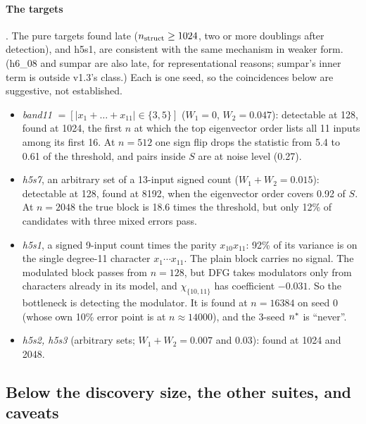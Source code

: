 \paragraph{The targets} . The pure targets found late ($n_{\rm struct}\ge1024$, two or more doublings after detection), and h5s1, are consistent with the same mechanism in weaker form. (h6\_08 and sumpar are also late, for representational reasons; sumpar's inner term is outside v1.3's class.) Each is one seed, so the coincidences below are suggestive, not established.
\begin{itemize}
\item \emph{band11} $=[|x_1+\dots+x_{11}|\in\{3,5\}]$ ($W_1=0$, $W_2=0.047$): detectable at 128, found at 1024, the first $n$ at which the top eigenvector order lists all 11 inputs among its first 16. At $n=512$ one sign flip drops the statistic from 5.4 to 0.61 of the threshold, and pairs inside $S$ are at noise level (0.27).
\item \emph{h5s7}, an arbitrary set of a 13-input signed count ($W_1+W_2=0.015$): detectable at 128, found at 8192, when the eigenvector order covers 0.92 of $S$. At $n=2048$ the true block is 18.6 times the threshold, but only 12\% of candidates with three mixed errors pass.
\item \emph{h5s1}, a signed 9-input count times the parity $x_{10}x_{11}$: 92\% of its variance is on the single degree-11 character $x_1\cdots x_{11}$. The plain block carries no signal. The modulated block passes from $n=128$, but DFG takes modulators only from characters already in its model, and $\chi_{\{10,11\}}$ has coefficient $-0.031$. So the bottleneck is detecting the modulator. It is found at $n=16384$ on seed 0 (whose own 10\% error point is at $n\approx14000$), and the 3-seed $n^{*}$ is ``never''.
\item \emph{h5s2, h5s3} (arbitrary sets; $W_1+W_2=0.007$ and $0.03$): found at 1024 and 2048.
\end{itemize}

\subsection{Below the discovery size, the other suites, and caveats}\label{app:interp-below}

